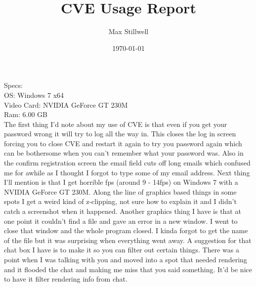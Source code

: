 \documentclass[12pt]{article}
\title{CVE Usage Report}
\author{Max Stillwell}
\date{\today}
\begin{document}
 \maketitle

 \noindent Specs: \\
 OS: Windows 7 x64 \\
 Video Card: NVIDIA GeForce GT 230M \\
 Ram: 6.00 GB \\[0.5cm]

 The first thing I'd note about my use of CVE is that even if you get your password wrong it will try to log all the way in. This closes the log in screen forcing you to close CVE and restart  it again to try you password again which can be bothersome when you can't remember what your password was. Also in the confirm registration screen the email field cuts off long emails which  confused me for awhile as I thought I forgot to type some of my email address. Next thing I'll mention is that I get horrible fps (around 9 - 14fps) on Windows 7 with a NVIDIA GeForce GT  230M. Along the line of graphics based things in some spots I get a weird kind of z-clipping, not sure how to explain it and I didn't catch a screenshot when it happened. Another graphics  thing I have is that at one point it couldn't find a file and gave an error in a new window. I went to close that window and the whole program closed. I kinda forgot to get the name of the  file but it was surprising when everything went away. A suggestion for  that chat box I have  is to make it so you can filter out certain things. There was a point when I was talking with  you and moved into a spot that needed rendering and it flooded the chat and  making me miss that  you said something. It'd be nice to have it filter rendering info from chat. 
\end{document}
